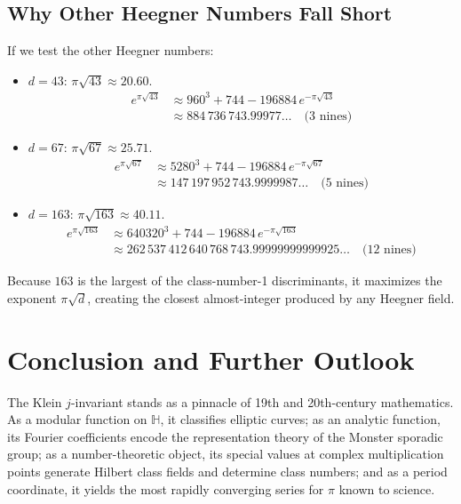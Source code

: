 \documentclass[a4paper]{article}
\begin{document}
\subsection{Why Other Heegner Numbers Fall Short}
If we test the other Heegner numbers:
\begin{itemize}[leftmargin=2em]
 \item $d = 43$: $\pi \sqrt{43} \approx 20.60$.
 \begin{align}
  e^{\pi \sqrt{43}} &\approx 960^3 + 744 - 196884 \, e^{-\pi \sqrt{43}} \nonumber\\
  &\approx 884\,736\,743.99977\dots \quad \text{(3 nines)}
 \end{align}
 \item $d = 67$: $\pi \sqrt{67} \approx 25.71$.
 \begin{align}
  e^{\pi \sqrt{67}} &\approx 5280^3 + 744 - 196884 \, e^{-\pi \sqrt{67}} \nonumber\\
  &\approx 147\,197\,952\,743.9999987\dots \quad \text{(5 nines)}
 \end{align}
 \item $d = 163$: $\pi \sqrt{163} \approx 40.11$.
 \begin{align}
  e^{\pi \sqrt{163}} &\approx 640320^3 + 744 - 196884 \, e^{-\pi \sqrt{163}} \nonumber\\
  &\approx 262\,537\,412\,640\,768\,743.99999999999925\dots \quad \text{(12 nines)}
 \end{align}
\end{itemize}
Because $163$ is the largest of the class-number-1 discriminants, it maximizes the exponent $\pi \sqrt{d}$, creating the closest almost-integer produced by any Heegner field.

\section{Conclusion and Further Outlook}
The Klein $j$-invariant stands as a pinnacle of 19th and 20th-century mathematics. As a modular function on $\mathbb{H}$, it classifies elliptic curves; as an analytic function, its Fourier coefficients encode the representation theory of the Monster sporadic group; as a number-theoretic object, its special values at complex multiplication points generate Hilbert class fields and determine class numbers; and as a period coordinate, it yields the most rapidly converging series for $\pi$ known to science.
\end{document}
